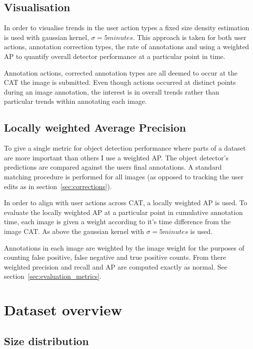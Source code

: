 \subsection{Visualisation}
\label{sec:visualisation}

In order to visualise trends in the user action types a fixed size density estimation is used with gaussian kernel, $\sigma=5 minutes$. This approach is taken for both user actions, annotation correction types, the rate of annotations and using a weighted \gls{AP} to quantify overall detector performance at a particular point in  time.

Annotation actions, corrected annotation types are all deemed to occur at the \gls{CAT} the image is submitted. Even though actions occurred at distinct points during an image annotation, the interest is in overall trends rather than particular trends within annotating each image. 

\subsection {Locally weighted Average Precision}
\label{sec:noisy_trends}

To give a single metric for object detection performance where parts of a dataset are more important than others I use a weighted \gls{AP}. The object detector's predictions are compared against the users final annotations. A standard matching procedure is performed for all images (as opposed to tracking the user edits as in section~\ref{sec:corrections}).

In order to align with user actions across \gls{CAT}, a locally weighted \gls{AP} is used. To evaluate the locally weighted \gls{AP} at a particular point in cumulative annotation time, each image is given a weight according to it's time difference from the image \gls{CAT}. As above the gaussian kernel with $\sigma=5 minutes$ is used.

Annotations in each image are weighted by the image weight for the purposes of counting false positive, false negative and true positive counts. From there weighted precision and recall and \gls{AP} are computed exactly as normal. See section~\ref{sec:evaluation_metrics}.


\section {Dataset overview}
\subsection {Size distribution}

